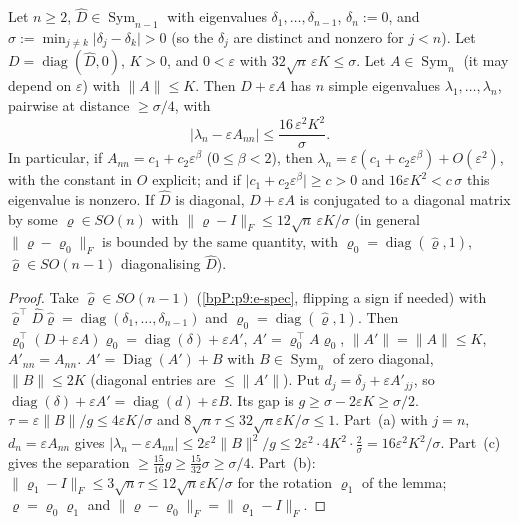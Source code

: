 \begin{corollary}\label{bpP:p9:cor72}
Let $n\ge2$, $\hat D\in\operatorname{Sym}_{n-1}$ with eigenvalues $\delta_1,\dots,\delta_{n-1}$, $\delta_n:=0$, and $\sigma:=\min_{j\ne k}\lvert\delta_j-\delta_k\rvert>0$ (so the $\delta_j$ are distinct and nonzero for $j<n$). Let $D=\operatorname{diag}(\hat D,0)$, $K>0$, and $0<\varepsilon$ with $32\sqrt n\,\varepsilon K\le\sigma$. Let $A\in\operatorname{Sym}_n$ (it may depend on $\varepsilon$) with $\lVert A\rVert\le K$. Then $D+\varepsilon A$ has $n$ simple eigenvalues $\lambda_1,\dots,\lambda_n$, pairwise at distance $\ge\sigma/4$, with
\[\lvert\lambda_n-\varepsilon A_{nn}\rvert\le\frac{16\,\varepsilon^2K^2}{\sigma}.\]
In particular, if $A_{nn}=c_1+c_2\varepsilon^\beta$ ($0\le\beta<2$), then $\lambda_n=\varepsilon(c_1+c_2\varepsilon^\beta)+O(\varepsilon^2)$, with the constant in $O$ explicit; and if $\lvert c_1+c_2\varepsilon^\beta\rvert\ge c>0$ and $16\varepsilon K^2<c\,\sigma$ this eigenvalue is nonzero. If $\hat D$ is diagonal, $D+\varepsilon A$ is conjugated to a diagonal matrix by some $\varrho\in SO(n)$ with $\lVert\varrho-I\rVert_F\le12\sqrt n\,\varepsilon K/\sigma$ (in general $\lVert\varrho-\varrho_0\rVert_F$ is bounded by the same quantity, with $\varrho_0=\operatorname{diag}(\hat\varrho,1)$, $\hat\varrho\in SO(n-1)$ diagonalising $\hat D$).
\end{corollary}
\begin{proof}
\label{stepP:p9:c72-rot} Take $\hat\varrho\in SO(n-1)$ (\ref{bpP:p9:e-spec}, flipping a sign if needed) with $\hat\varrho^\top\hat D\hat\varrho=\operatorname{diag}(\delta_1,\dots,\delta_{n-1})$ and $\varrho_0=\operatorname{diag}(\hat\varrho,1)$. Then $\varrho_0^\top(D+\varepsilon A)\varrho_0=\operatorname{diag}(\delta)+\varepsilon A'$, $A'=\varrho_0^\top A\varrho_0$, $\lVert A'\rVert=\lVert A\rVert\le K$, $A'_{nn}=A_{nn}$.
\label{stepP:p9:c72-split} $A'=\operatorname{Diag}(A')+B$ with $B\in\operatorname{Sym}_n$ of zero diagonal, $\lVert B\rVert\le2K$ (diagonal entries are $\le\lVert A'\rVert$). Put $d_j=\delta_j+\varepsilon A'_{jj}$, so $\operatorname{diag}(\delta)+\varepsilon A'=\operatorname{diag}(d)+\varepsilon B$. Its gap is $g\ge\sigma-2\varepsilon K\ge\sigma/2$.
\label{stepP:p9:c72-apply} $\tau=\varepsilon\lVert B\rVert/g\le4\varepsilon K/\sigma$ and $8\sqrt n\tau\le32\sqrt n\varepsilon K/\sigma\le1$. Part~(a) with $j=n$, $d_n=\varepsilon A_{nn}$ gives $\lvert\lambda_n-\varepsilon A_{nn}\rvert\le2\varepsilon^2\lVert B\rVert^2/g\le2\varepsilon^2\cdot4K^2\cdot\frac2\sigma=16\varepsilon^2K^2/\sigma$. Part~(c) gives the separation $\ge\frac{15}{16}g\ge\frac{15}{32}\sigma\ge\sigma/4$. Part~(b): $\lVert\varrho_1-I\rVert_F\le3\sqrt n\tau\le12\sqrt n\varepsilon K/\sigma$ for the rotation $\varrho_1$ of the lemma; $\varrho=\varrho_0\varrho_1$ and $\lVert\varrho-\varrho_0\rVert_F=\lVert\varrho_1-I\rVert_F$.
\end{proof}

